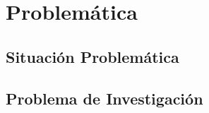 \chapter{Problemática}
\label{Problemática}

\section{Situación Problemática}


\section{Problema de Investigación}
